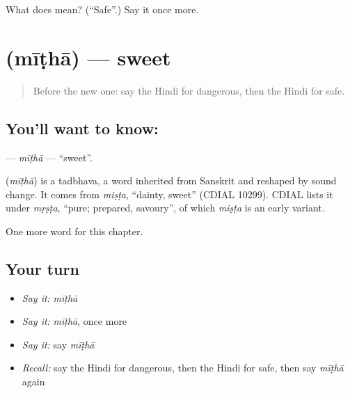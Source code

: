 \begin{tcolorbox}[breakable,colback=teal!4,colframe=teal!35!black,title={Before you move on}]
What does  mean? (\textquotedblleft{}Safe\textquotedblright{}.) Say it once more.
\end{tcolorbox}
\section[\texorpdfstring{\hi{मीठा} (mīṭhā)}{मीठा (mīṭhā)}]{ (mīṭhā) — sweet}

\label{lesson:HI-C213-mitha}



\begin{quote}
Before the new one: say the Hindi for dangerous, then the Hindi for safe.
\end{quote}

\subsection*{You'll want to know: }
\textbf{} — \emph{mīṭhā} — \textquotedblleft{}sweet\textquotedblright{}.

\begin{cousinweb}
\textbf{} (\emph{mīṭhā}) is a tadbhava, a word inherited from Sanskrit and reshaped by sound change. It comes from \emph{miṣṭa}, \textquotedblleft{}dainty, sweet\textquotedblright{} (CDIAL 10299). CDIAL lists it under \emph{mṛṣṭa}, \textquotedblleft{}pure; prepared, savoury\textquotedblright{}, of which \emph{miṣṭa} is an early variant.
\end{cousinweb}

\begin{grammarlens}[title={What you've built}]
One more word for this chapter.
\end{grammarlens}

\subsection*{Your turn}
\begin{itemize}
\raggedright
  \item \emph{Say it:} \emph{mīṭhā}
  \item \emph{Say it:} \emph{mīṭhā}, once more
  \item \emph{Say it:} say \emph{mīṭhā}
  \item \emph{Recall:} say the Hindi for dangerous, then the Hindi for safe, then say \emph{mīṭhā} again
\end{itemize}

